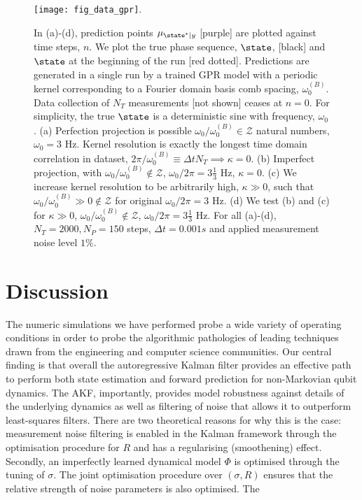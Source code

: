 { 
\begin{figure}
    \texttt{[image: fig\_data\_gpr]}. 
    \caption{\label{fig:main:fig_data_gpr} In (a)-(d), prediction points $\mu_{\state^*|y}$ [purple] are plotted against time steps, $n$. We plot the true phase sequence,  $\state$, [black] and  $\state$ at the beginning of the run [red dotted]. Predictions are generated in a single run by a trained GPR model with a periodic kernel corresponding to a Fourier domain basis comb spacing, $\omega_0^{(B)}$. Data collection of $N_T$ measurements [not shown] ceases at $n=0$. For simplicity, the true $\state$ is a deterministic sine with frequency, $\omega_0$. (a) Perfection projection is possible $\omega_0 / \omega_0^{(B)} \in \mathcal{Z}$ natural numbers, $\omega_0 = 3$ Hz. Kernel resolution is exactly the longest time domain correlation in dataset, $2 \pi / \omega_0^{(B)} \equiv \Delta t N_T \implies \kappa = 0$.   (b) Imperfect projection, with $\omega_0 / \omega_0^{(B)} \notin \mathcal{Z}$, $\omega_0 / 2 \pi = 3 \frac{1}{3}$ Hz, $\kappa=0$. (c) We increase kernel resolution to be arbitrarily high, $\kappa \gg 0 $, such that $\omega_0 / \omega_0^{(B)} \gg 0 \notin \mathcal{Z}$ for original $ \omega_0 / 2 \pi = 3$ Hz. (d) We test (b) and (c) for $\kappa \gg0$, $ \omega_0 / \omega_0^{(B)} \notin \mathcal{Z}$, $\omega_0 / 2 \pi = 3 \frac{1}{3}$ Hz. For all (a)-(d), $N_T = 2000, N_P = 150$ steps, $\Delta t = 0.001s$ and applied measurement noise level $1\%$.} 
\end{figure}



\section{Discussion} \label{sec:main:discussion}
The numeric simulations we have performed probe a wide variety of operating conditions in order to probe the algorithmic pathologies of leading techniques drawn from the engineering and computer science communities.  Our central finding is that overall the autoregressive Kalman filter provides an effective path to perform both state estimation and forward prediction for non-Markovian qubit dynamics. The AKF, importantly, provides model robustness against details of the underlying dynamics as well as filtering of noise that allows it to outperform least-squares filters.  There are two theoretical reasons for why this is the case: measurement noise filtering is enabled in the Kalman framework through the optimisation procedure for $R$ and has a regularising (smoothening) effect. Secondly, an imperfectly learned dynamical model $\Phi$ is optimised through the tuning of $\sigma$. The joint optimisation procedure over $(\sigma, R)$ ensures that the relative strength of noise parameters is also optimised.  The 

}
